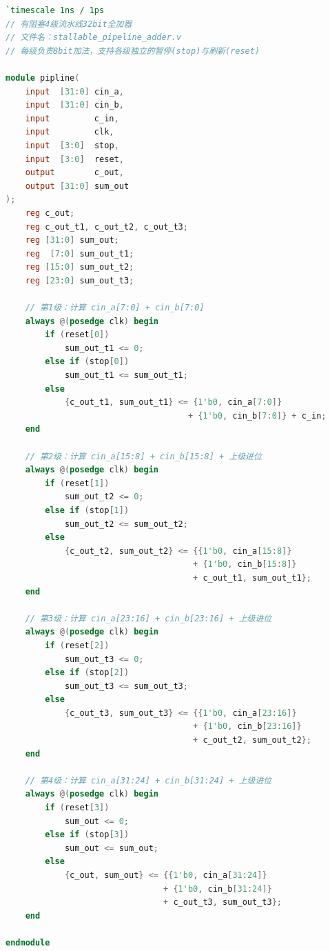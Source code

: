 \begin{lstlisting}[language=Verilog]
`timescale 1ns / 1ps
// 有阻塞4级流水线32bit全加器
// 文件名：stallable_pipeline_adder.v
// 每级负责8bit加法，支持各级独立的暂停(stop)与刷新(reset)

module pipline(
    input  [31:0] cin_a,
    input  [31:0] cin_b,
    input         c_in,
    input         clk,
    input  [3:0]  stop,
    input  [3:0]  reset,
    output        c_out,
    output [31:0] sum_out
);
    reg c_out;
    reg c_out_t1, c_out_t2, c_out_t3;
    reg [31:0] sum_out;
    reg  [7:0] sum_out_t1;
    reg [15:0] sum_out_t2;
    reg [23:0] sum_out_t3;

    // 第1级：计算 cin_a[7:0] + cin_b[7:0]
    always @(posedge clk) begin
        if (reset[0])
            sum_out_t1 <= 0;
        else if (stop[0])
            sum_out_t1 <= sum_out_t1;
        else
            {c_out_t1, sum_out_t1} <= {1'b0, cin_a[7:0]}
                                     + {1'b0, cin_b[7:0]} + c_in;
    end

    // 第2级：计算 cin_a[15:8] + cin_b[15:8] + 上级进位
    always @(posedge clk) begin
        if (reset[1])
            sum_out_t2 <= 0;
        else if (stop[1])
            sum_out_t2 <= sum_out_t2;
        else
            {c_out_t2, sum_out_t2} <= {{1'b0, cin_a[15:8]}
                                      + {1'b0, cin_b[15:8]}
                                      + c_out_t1, sum_out_t1};
    end

    // 第3级：计算 cin_a[23:16] + cin_b[23:16] + 上级进位
    always @(posedge clk) begin
        if (reset[2])
            sum_out_t3 <= 0;
        else if (stop[2])
            sum_out_t3 <= sum_out_t3;
        else
            {c_out_t3, sum_out_t3} <= {{1'b0, cin_a[23:16]}
                                      + {1'b0, cin_b[23:16]}
                                      + c_out_t2, sum_out_t2};
    end

    // 第4级：计算 cin_a[31:24] + cin_b[31:24] + 上级进位
    always @(posedge clk) begin
        if (reset[3])
            sum_out <= 0;
        else if (stop[3])
            sum_out <= sum_out;
        else
            {c_out, sum_out} <= {{1'b0, cin_a[31:24]}
                                + {1'b0, cin_b[31:24]}
                                + c_out_t3, sum_out_t3};
    end

endmodule
\end{lstlisting}
